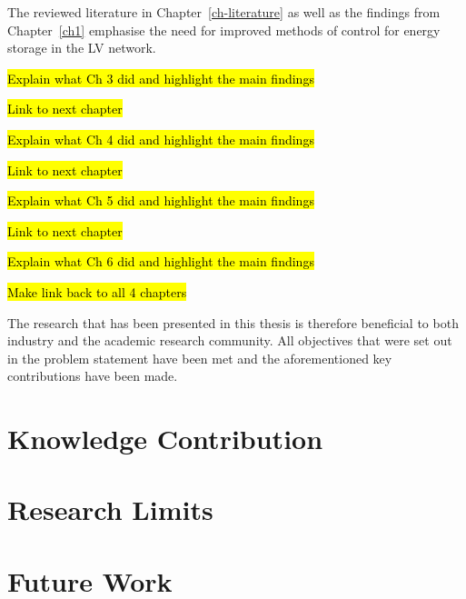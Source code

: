 The reviewed literature in Chapter~\ref{ch-literature} as well as the findings from Chapter~\ref{ch1} emphasise the need for improved methods of control for energy storage in the LV network.

\hl{Explain what Ch 3 did and highlight the main findings}

\hl{Link to next chapter}

\hl{Explain what Ch 4 did and highlight the main findings}

\hl{Link to next chapter}

\hl{Explain what Ch 5 did and highlight the main findings}

\hl{Link to next chapter}

\hl{Explain what Ch 6 did and highlight the main findings}

\hl{Make link back to all 4 chapters}


The research that has been presented in this thesis is therefore beneficial to both industry and the academic research community.
All objectives that were set out in the problem statement have been met and the aforementioned key contributions have been made.

\section{Knowledge Contribution}
\label{ch-conclusion:knowledge-contribution}

\section{Research Limits}
\label{ch-conclusion:research-limits}

\section{Future Work}
\label{ch-conclusion:future-work}
